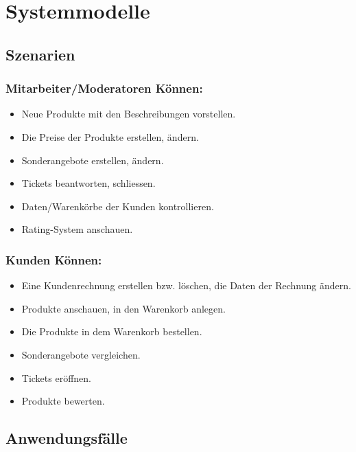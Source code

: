 \documentclass[parskip=full]{scrartcl}
\begin{document}
\section{Systemmodelle}

\subsection{Szenarien}

\subsubsection{Mitarbeiter/Moderatoren Können:}
\begin{itemize}[nosep]
	\item Neue Produkte mit den Beschreibungen vorstellen.
	\item Die Preise der Produkte erstellen, ändern.
	\item Sonderangebote erstellen, ändern.
	\item Tickets beantworten, schliessen.
	\item Daten/Warenkörbe der Kunden kontrollieren.
	\item Rating-System anschauen.
\end{itemize}
\subsubsection{Kunden Können:}
\begin{itemize}[nosep]
	\item Eine Kundenrechnung erstellen bzw. löschen, die Daten der Rechnung ändern.
	\item Produkte anschauen, in den Warenkorb anlegen.
	\item Die Produkte in dem Warenkorb bestellen.
	\item Sonderangebote vergleichen.
	\item Tickets eröffnen.
	\item Produkte bewerten.
\end{itemize}

\subsection{Anwendungsfälle}
\end{document}
